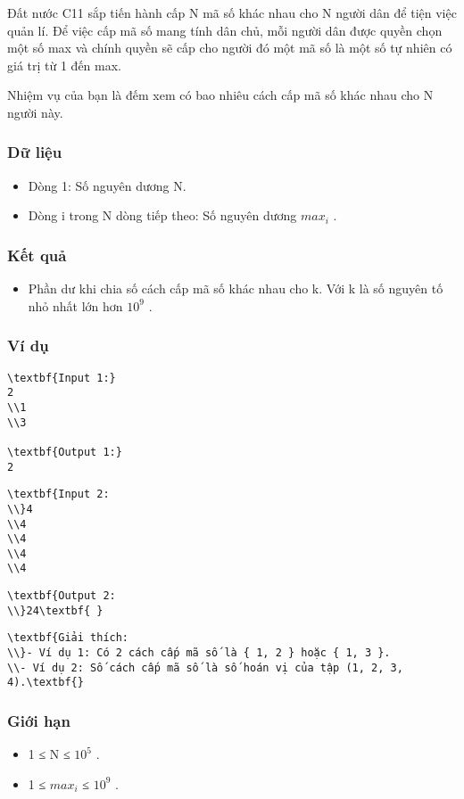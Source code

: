 



   Đất nước C11 sắp tiến hành cấp N mã số khác nhau cho N người dân để tiện việc quản lí. Để việc cấp mã số mang tính dân chủ, mỗi người dân được quyền chọn một số max và chính quyền sẽ cấp cho người đó một mã số là một số tự nhiên có giá trị từ 1 đến max.  

   Nhiệm vụ của bạn là đếm xem có bao nhiêu cách cấp mã số khác nhau cho N người này.  

\subsubsection{   Dữ liệu  }
\begin{itemize}
	\item     Dòng 1: Số nguyên dương N.   
	\item     Dòng i trong N dòng tiếp theo: Số nguyên dương $max_{i}$    .   
\end{itemize}

\subsubsection{   Kết quả  }
\begin{itemize}
	\item     Phần dư khi chia số cách cấp mã số khác nhau cho k. Với k là số nguyên tố nhỏ nhất lớn hơn $10^{9}$    .   
\end{itemize}

\subsubsection{   Ví dụ  }
\begin{verbatim}
\textbf{Input 1:}
2
\\1
\\3

\textbf{Output 1:}
2\end{verbatim}
\begin{verbatim}
\textbf{Input 2:
\\}4
\\4
\\4
\\4
\\4 \end{verbatim}
\begin{verbatim}
\textbf{Output 2:
\\}24\textbf{ }\end{verbatim}
\begin{verbatim}
\textbf{Giải thích:
\\}- Ví dụ 1: Có 2 cách cấp mã số là { 1, 2 } hoặc { 1, 3 }.
\\- Ví dụ 2: Số cách cấp mã số là số hoán vị của tập (1, 2, 3, 4).\textbf{}\end{verbatim}

\subsubsection{   Giới hạn  }
\begin{itemize}
	\item     1 ≤ N ≤ $10^{5}$    .   
	\item     1 ≤ $max_{i}$    ≤ $10^{9}$    .   
\end{itemize}
